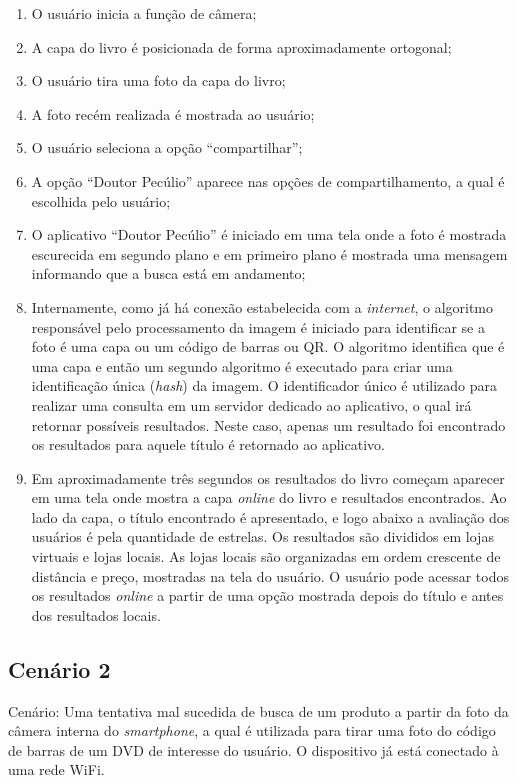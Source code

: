 \begin{enumerate}
\item O usuário inicia a função de câmera;
\item A capa do livro é posicionada de forma aproximadamente ortogonal;
\item O usuário tira uma foto da capa do livro;
\item A foto recém realizada é mostrada ao usuário;
\item O usuário seleciona a opção ``compartilhar'';
\item A opção ``Doutor Pecúlio'' aparece nas opções de compartilhamento,
    a qual é escolhida pelo usuário;
\item O aplicativo ``Doutor Pecúlio'' é iniciado em uma tela onde a foto
    é mostrada escurecida em segundo plano e em primeiro plano é mostrada uma
    mensagem informando que a busca está em andamento;
\item Internamente, como já há conexão estabelecida com a \emph{internet}, o
    algoritmo responsável pelo processamento da imagem é iniciado para identificar
    se a foto é uma capa ou um código de barras ou QR.  O algoritmo identifica que 
    é uma capa e então um segundo algoritmo é executado para criar uma
    identificação única (\emph{hash}) da imagem.   O identificador único é
    utilizado para realizar uma consulta em um servidor dedicado ao aplicativo,
    o qual irá retornar possíveis resultados.  Neste caso, apenas um resultado
    foi encontrado os resultados para aquele título é retornado ao aplicativo.
\item Em aproximadamente três segundos os resultados do livro começam 
    aparecer em uma tela onde mostra a capa \emph{online} do livro e
    resultados encontrados.  Ao lado da capa, o título encontrado é apresentado,
    e logo abaixo a avaliação dos usuários é pela quantidade de estrelas.
    Os resultados são divididos em lojas virtuais
    e lojas locais.  As lojas locais são organizadas em ordem crescente de
    distância e preço, mostradas na tela do usuário.   O usuário pode acessar
    todos os resultados \emph{online} a partir de uma opção mostrada depois
    do título e antes dos resultados locais.    
\end{enumerate}

\subsection{Cenário 2} \label{cenario2}


Cenário: Uma tentativa mal sucedida de busca de um produto a partir da
foto da câmera interna do \emph{smartphone}, a qual é utilizada para
tirar uma foto do código de barras de um DVD de interesse do usuário.  O dispositivo
já está conectado à uma rede WiFi.

